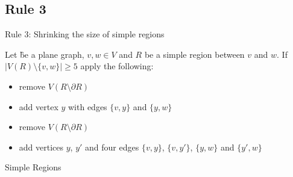 \subsection{Rule 3}
\begin{frame}[c]{Rule 3: Shrinking the size of simple regions}

    Let \G be a plane graph, $v, w \in V$ and $R$ be a simple region between $v$ and $w$. If $|V(R) \setminus \{v, w\}| \geq 5$ apply the following:

    \begin{caseof}

            \begin{itemize}
                    \item remove $V(R\setminus\partial R)$
                    \item add vertex $y$ with edges $\{v, y\}$ and $\{y, w\}$
            \end{itemize}


            \begin{itemize}
                    \item remove $V(R\setminus\partial R)$
                    \item add vertices $y$, $y'$ and four edges $\{v,y\}$, $\{v, y'\}$, $\{y, w\}$ and $\{y', w\}$
            \end{itemize}
        \end{caseof}
\end{frame}

\begin{frame}[c]{Simple Regions}

\end{frame}

